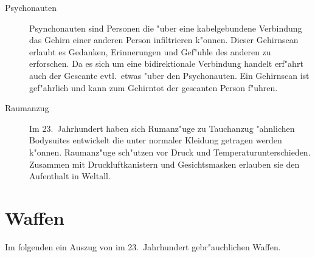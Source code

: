\begin{appendices}
\begin{description}
\item [Psychonauten] Psynchonauten sind Personen die "uber eine kabelgebundene Verbindung das Gehirn
      einer anderen Person infiltrieren k"onnen. Dieser Gehirnscan erlaubt es Gedanken, Erinnerungen und Gef"uhle des anderen zu erforschen. Da es sich um eine bidirektionale Verbindung handelt erf"ahrt auch der Gescante evtl.~etwas "uber den Psychonauten. Ein Gehirnscan ist gef"ahrlich und kann zum Gehirntot der gescanten Person f"uhren.
\item [Raumanzug] Im 23.~Jahrhundert haben sich Rumanz"uge zu Tauchanzug "ahnlichen Bodysuites entwickelt die unter
      normaler Kleidung getragen werden k"onnen. Raumanz"uge sch"utzen vor Druck und Temperaturunterschieden. Zusammen mit Druckluftkanistern und Gesichtsmasken erlauben sie den Aufenthalt in Weltall.
\end{description}

\section{Waffen}

Im folgenden ein Auszug von im 23.~Jahrhundert gebr"auchlichen Waffen.



\end{appendices}
